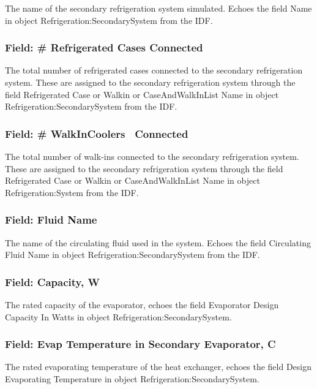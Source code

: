 The name of the secondary refrigeration system simulated. Echoes the field Name in object Refrigeration:SecondarySystem from the IDF.

\subsubsection{Field: \# Refrigerated Cases Connected}\label{field-refrigerated-cases-connected-3}

The total number of refrigerated cases connected to the secondary refrigeration system. These are assigned to the secondary refrigeration system through the field Refrigerated Case or Walkin or CaseAndWalkInList Name in object Refrigeration:SecondarySystem from the IDF.

\subsubsection{Field: \# WalkInCoolers~ Connected}\label{field-walkincoolers-connected-3}

The total number of walk-ins connected to the secondary refrigeration system. These are assigned to the secondary refrigeration system through the field Refrigerated Case or Walkin or CaseAndWalkInList Name in object Refrigeration:System from the IDF.

\subsubsection{Field: Fluid Name}\label{field-fluid-name-1}

The name of the circulating fluid used in the system. Echoes the field Circulating Fluid Name in object Refrigeration:SecondarySystem from the IDF.

\subsubsection{Field: Capacity, W}\label{field-capacity-w-1}

The rated capacity of the evaporator, echoes the field Evaporator Design Capacity In Watts in object Refrigeration:SecondarySystem.

\subsubsection{Field: Evap Temperature in Secondary Evaporator, C}\label{field-evap-temperature-in-secondary-evaporator-c-1}

The rated evaporating temperature of the heat exchanger, echoes the field Design Evaporating Temperature in object Refrigeration:SecondarySystem.

